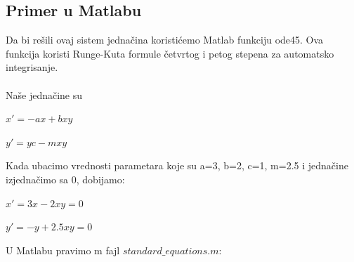 \documentclass[a4paper]{article}
\begin{document}
\subsection{Primer u Matlabu}
\label{sub:std_primer}
Da bi rešili ovaj sistem jednačina koristićemo Matlab funkciju ode45. Ova funkcija koristi Runge-Kuta
formule četvrtog i petog stepena za automatsko integrisanje.\\ \\
 Naše jednačine su 
	\begin{center}
		$x' = -ax + bxy$
	\end{center}
	\begin{center}
		$y' =yc - mxy$
	\end{center}
Kada ubacimo vrednosti parametara koje su a=3, b=2, c=1, m=2.5 i jednačine izjednačimo sa 0, dobijamo:
	\begin{center}
		$x'=3x - 2xy = 0$
	\end{center}
	\begin{center}
		$y'=-y + 2.5xy = 0$
	\end{center}
U Matlabu pravimo m fajl $ standard\_equations.m $:


\end{document}
